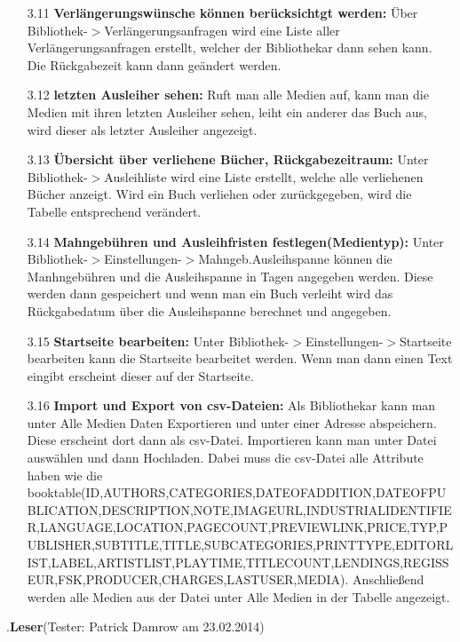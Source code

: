 \documentclass[fontsize=12pt,paper=a4,twoside]{scrartcl}
\begin{document}
\begin{itemize}
\item[3.11]\textbf{Verlängerungswünsche können berücksichtgt werden:} Über Bibliothek-$>$Verlängerungsanfragen wird eine Liste aller Verlängerungsanfragen erstellt, welcher der Bibliothekar dann sehen kann. Die Rückgabezeit kann dann geändert werden.
\item[3.12]\textbf{letzten Ausleiher sehen:} Ruft man alle Medien auf, kann man die Medien mit ihren letzten Ausleiher sehen, leiht ein anderer das Buch aus, wird dieser als letzter Ausleiher angezeigt.
\item[3.13]\textbf{Übersicht über verliehene Bücher, Rückgabezeitraum:} Unter Bibliothek-$>$Ausleihliste wird eine Liste erstellt, welche alle verliehenen Bücher anzeigt. Wird ein Buch verliehen oder zurückgegeben, wird die Tabelle entsprechend verändert.
\item[3.14]\textbf{Mahngebühren und Ausleihfristen festlegen(Medientyp):} Unter Bibliothek-$>$Einstellungen-$>$Mahngeb.Ausleihspanne können die Manhngebühren und die Ausleihspanne in Tagen angegeben werden. Diese werden dann gespeichert und wenn man ein Buch verleiht wird das Rückgabedatum über die Ausleihspanne berechnet und angegeben.
\item[3.15]\textbf{Startseite bearbeiten:} Unter Bibliothek-$>$Einstellungen-$>$Startseite bearbeiten kann die Startseite bearbeitet werden. Wenn man dann einen Text eingibt erscheint dieser auf der Startseite.
\item[3.16]\textbf{Import und Export von csv-Dateien:} Als Bibliothekar kann man unter Alle Medien Daten Exportieren und unter einer Adresse abspeichern. Diese erscheint dort dann als csv-Datei. Importieren kann man unter Datei auswählen und dann Hochladen. Dabei muss die csv-Datei alle Attribute haben wie die booktable(ID,AUTHORS,CATEGORIES,DATEOFADDITION,DATEOFPUBLICATION,DESCRIPTION,NOTE,IMAGEURL,INDUSTRIALIDENTIFIER,LANGUAGE,LOCATION,PAGECOUNT,PREVIEWLINK,PRICE,TYP,PUBLISHER,SUBTITLE,TITLE,SUBCATEGORIES,PRINTTYPE,EDITORLIST,LABEL,ARTISTLIST,PLAYTIME,TITLECOUNT,LENDINGS,REGISSEUR,FSK,PRODUCER,CHARGES,LASTUSER,MEDIA). Anschließend werden alle Medien aus der Datei unter Alle Medien in der Tabelle angezeigt.
\end{itemize}
.\textbf{Leser}(Tester: Patrick Damrow am 23.02.2014)\\
\end{document}
